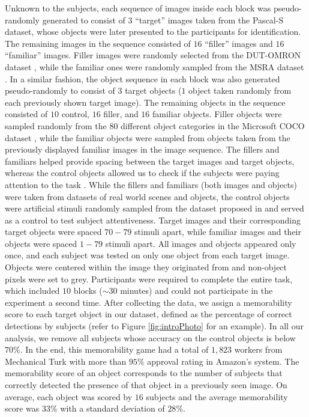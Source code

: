 Unknown to the subjects, each sequence of images inside each block was pseudo-randomly generated to consist of $3$ ``target'' images taken from the Pascal-S dataset, whose objects were later presented to the participants for identification. The remaining images in the sequence consisted of $16$ ``filler'' images and $16$ ``familiar'' images. 
Filler images were randomly selected from the DUT-OMRON dataset \cite{dutomron13}, while the familiar ones were randomly sampled from the MSRA dataset \cite{msra11}. In a similar fashion, the object sequence in each block was also generated pseudo-randomly to consist of $3$ target objects ($1$ object taken randomly from each previously shown target image). The remaining objects in the sequence consisted of $10$ control, $16$ filler, and $16$ familiar objects. Filler objects were sampled randomly from the $80$ different object categories in the Microsoft COCO dataset \cite{coco14}, while the familiar objects were sampled from objects taken from the previously displayed familiar images in the image sequence. The fillers and familiars helped provide spacing between the target images and target objects, whereas the control objects allowed us to check if the subjects were paying attention to the task \cite{brady08,isola11}. While the fillers and familiars (both images and objects) were taken from datasets of real world scenes and objects, the control objects were artificial stimuli randomly sampled from the dataset proposed in \cite{brady08} and served as a control to test subject attentiveness. Target images and their corresponding target objects were spaced $70-79$ stimuli apart, while familiar images and their objects were spaced $1-79$ stimuli apart. All images and objects appeared only once, and each subject was tested on only one object from each target image. Objects were centered within the image they originated from and non-object pixels were set to grey. Participants were required to complete the entire task, which included $10$ blocks ($\sim$$30$ minutes) and could not participate in the experiment a second time. After collecting the data, we assign a memorability score to each target object in our dataset, defined as the percentage of correct detections by subjects (refer to Figure \ref{fig:introPhoto} for an example). In all our analysis, we remove all subjects whose accuracy on the control objects is below $70\%$. In the end, this memorability game had a total of $1,823$ workers from Mechanical Turk with more than $95\%$ approval rating in Amazon’s system. The memorability score of an object corresponds to the number of subjects that correctly detected the presence of that object in a previously seen image. On average, each object was scored by $16$ subjects and the average memorability score was $33\%$ with a standard deviation of  $28\%$. %
